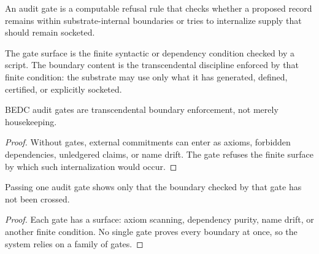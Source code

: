 \begin{definition}
\label{def:philosophy-audit-gate}
An audit gate is a computable refusal rule that checks whether a
proposed record remains within substrate-internal boundaries or tries
to internalize supply that should remain socketed.
\end{definition}

\begin{definition}
\label{def:philosophy-gate-surface-boundary-content}
The gate surface is the finite syntactic or dependency condition
checked by a script. The boundary content is the transcendental
discipline enforced by that finite condition: the substrate may use
only what it has generated, defined, certified, or explicitly socketed.
\end{definition}

\begin{theorem}
\label{thm:philosophy-audit-gates-boundary-enforcement}
BEDC audit gates are transcendental boundary enforcement, not merely
housekeeping.
\end{theorem}
\begin{proof}
Without gates, external commitments can enter as axioms, forbidden
dependencies, unledgered claims, or name drift. The gate refuses the
finite surface by which such internalization would occur.
\end{proof}

\begin{corollary}
\label{cor:philosophy-gate-finite-scope}
Passing one audit gate shows only that the boundary checked by that
gate has not been crossed.
\end{corollary}
\begin{proof}
Each gate has a surface: axiom scanning, dependency purity, name drift,
or another finite condition. No single gate proves every boundary at
once, so the system relies on a family of gates.
\end{proof}
